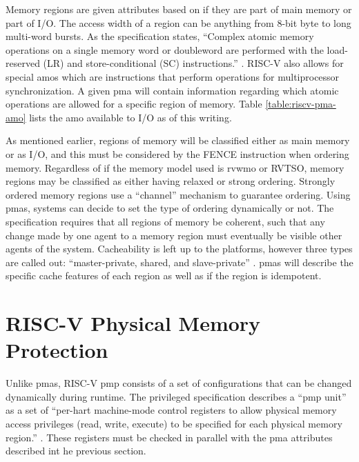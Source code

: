 Memory regions are given attributes based on if they are part of main memory or part of I/O. The access width of a region can be anything from 8-bit byte to long multi-word bursts. As the specification states, ``Complex atomic memory operations on a single memory word or doubleword are performed with the
load-reserved (LR) and store-conditional (SC) instructions.'' \cite{PrivIsa2019}. RISC-V also allows for special \glspl{amo} which are instructions that perform operations for multiprocessor synchronization. A given \gls{pma} will contain information regarding which atomic operations are allowed for a specific region of memory.  Table \ref{table:riscv-pma-amo} lists the \gls{amo} available to I/O as of this writing.

\renewcommand{\arraystretch}{1.5}


As mentioned earlier, regions of memory will be classified either as main memory or as I/O, and this must be considered by the FENCE instruction when ordering memory. Regardless of if the memory model used is \gls{rvwmo} or RVTSO, memory regions may be classified as either having relaxed or strong ordering. Strongly ordered memory regions use a ``channel'' mechanism to guarantee ordering. Using \glspl{pma}, systems can decide to set the type of ordering dynamically or not. The specification requires that all regions of memory be coherent, such that any change made by one agent to a memory region must eventually be visible other agents of the system. Cacheability is left up to the platforms, however three types are called out: ``master-private, shared, and slave-private'' \cite{PrivIsa2019}. \glspl{pma} will describe the specific cache features of each region as well as if the region is idempotent.

\section{RISC-V Physical Memory Protection}
Unlike \glspl{pma}, RISC-V \gls{pmp} consists of a set of configurations that can be changed dynamically during runtime. The privileged specification describes a ``\gls{pmp} unit'' as a set of ``per-hart machine-mode control registers to allow physical memory access privileges (read, write, execute) to be specified for each physical memory region.'' \cite{PrivIsa2019}. These registers must be checked in parallel with the \gls{pma} attributes described int he previous section.

\renewcommand{\arraystretch}{2}


